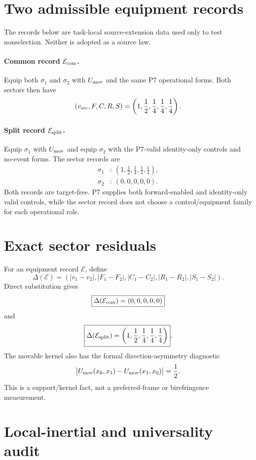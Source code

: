\documentclass[11pt]{article}
\begin{document}
\section{Two admissible equipment records}

The records below are task-local source-extension data used only to test
nonselection.  Neither is adopted as a source law.

\paragraph{Common record \(\mathcal E_{\rm com}\).}
Equip both \(\sigma_1\) and \(\sigma_2\) with \(U_{\rm mov}\) and the same P7
operational forms.  Both sectors then have
\[
 (v_{\rm src},F,C,R,S)
   =\left(1,\frac12,\frac14,\frac14,\frac14\right).
\]

\paragraph{Split record \(\mathcal E_{\rm split}\).}
Equip \(\sigma_1\) with \(U_{\rm mov}\) and equip \(\sigma_2\) with the
P7-valid identity-only controls and no-event forms.  The sector records are
\[
\begin{aligned}
 \sigma_1 &:\
 \left(1,\frac12,\frac14,\frac14,\frac14\right),\\
 \sigma_2 &:\
 (0,0,0,0,0).
\end{aligned}
\]
Both records are target-free.  P7 supplies both forward-enabled and
identity-only valid controls, while the sector record does not choose a
control/equipment family for each operational role.

\section{Exact sector residuals}

For an equipment record \(\mathcal E\), define
\[
 \Delta(\mathcal E)=
 \left(
 |v_1-v_2|,
 |F_1-F_2|,
 |C_1-C_2|,
 |R_1-R_2|,
 |S_1-S_2|
 \right).
\]
Direct substitution gives
\[
 \boxed{\Delta(\mathcal E_{\rm com})=(0,0,0,0,0)}
\]
and
\[
 \boxed{\Delta(\mathcal E_{\rm split})=
 \left(1,\frac12,\frac14,\frac14,\frac14\right)}.
\]
The movable kernel also has the formal direction-asymmetry diagnostic
\[
 \bigl|U_{\rm mov}(x_0,x_1)-U_{\rm mov}(x_1,x_0)\bigr|=\frac12.
\]
This is a support/kernel fact, not a preferred-frame or birefringence
measurement.

\section{Local-inertial and universality audit}
\end{document}
